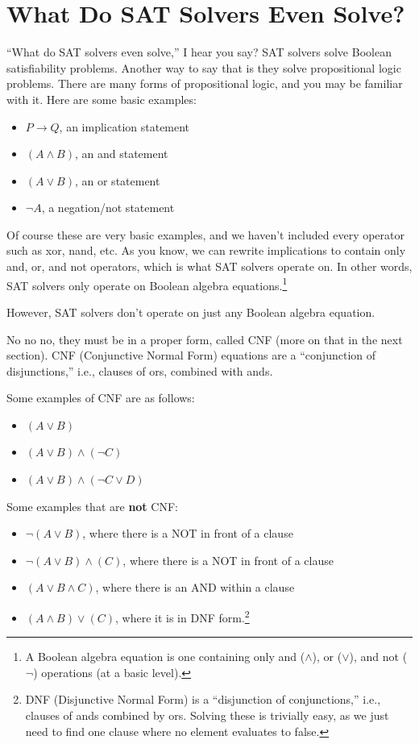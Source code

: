 \section{What Do SAT Solvers Even Solve?}

``What do SAT solvers even solve,'' I hear you say? SAT solvers solve Boolean satisfiability problems. Another way to say that is they solve propositional logic problems. There are many forms of propositional logic, and you may be familiar with it. Here are some basic examples:

\begin{itemize}
    \item $P \rightarrow Q$, an implication statement
    \item $(A \land B)$, an and statement
    \item $(A \lor B)$, an or statement
    \item $\neg A$, a negation/not statement
\end{itemize}

Of course these are very basic examples, and we haven't included every operator such as xor, nand, etc. As you know, we can rewrite implications to contain only and, or, and not operators, which is what SAT solvers operate on. In other words, SAT solvers only operate on Boolean algebra equations.\footnote{A Boolean algebra equation is one containing only and ($\land$), or ($\lor$), and not ($\neg$) operations (at a basic level).}

However, SAT solvers don't operate on just any Boolean algebra equation.

No no no, they must be in a proper form, called CNF (more on that in the next section). CNF (Conjunctive Normal Form) equations are a ``conjunction of disjunctions,'' i.e., clauses of ors, combined with ands.

Some examples of CNF are as follows:

\begin{itemize}
    \item $(A \lor B)$
    \item $(A \lor B) \land (\neg C)$
    \item $(A \lor B) \land (\neg C \lor D)$
\end{itemize}

Some examples that are \textbf{not} CNF:

\begin{itemize}
    \item $\neg(A \lor B)$, where there is a NOT in front of a clause
    \item $\neg(A \lor B) \land (C)$, where there is a NOT in front of a clause
    \item $(A \lor B \land C)$, where there is an AND within a clause
    \item $(A \land B) \lor (C)$, where it is in DNF form.\footnote{DNF (Disjunctive Normal Form) is a ``disjunction of conjunctions,'' i.e., clauses of ands combined by ors. Solving these is trivially easy, as we just need to find one clause where no element evaluates to false.}
\end{itemize}

